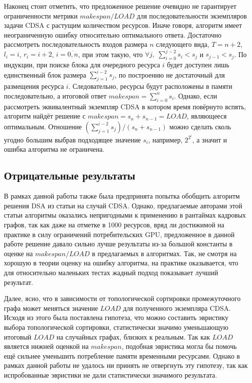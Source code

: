 Наконец стоит отметить, что предложенное решение очевидно не гарантирует ограниченности метрики $makespan/LOAD$ для последовательности экземпляров задачи CDSA с растущим количеством ресурсов.
Иначе говоря, алгоритм имеет неограниченную ошибку относительно оптимального ответа.
Достаточно рассмотреть последовательность входов размера $n$ следующего вида, $T = n + 2$, $l_i = i$, $r_i = i + 2$, $i = \overline{0,n}$, при этом такую, что $\forall j,\;\sum_{i=0}^{j-2} s_i < s_j$ и $s_{j-1} < s_j$.
По индукции, при поиске блока для очередного ресурса $i$ будет доступен лишь единственный блок размера $\sum_{j=1}^{i-2} s_j$, по построению не достаточный для размещения ресурса $i$.
Следовательно, ресурсы будут расположены в памяти последовательно, а итоговой ответ $makespan = \sum_{i=0}^n s_i$.
Однако, если рассмотреть эквивалентный экземпляр CDSA в котором время повёрнуто вспять, алгоритм найдёт решение с $makespan = s_n + s_{n-1} = LOAD$, являющееся оптимальным.
Отношение $\left(\sum_{j=1}^{i-2} s_j\right)/\left(s_n + s_{n-1}\right)$ можно сделать сколь угодно большим выбрав подходящее значение $s_i$, например, $2^{2^i}$, а значит и ошибка алгоритма не ограничена.

\subsection{Отрицательные результаты} \label{negativeResults}
В рамках данной работы также была предпринята попытка обобщить алгоритм решения DSA из статьи \cite{buchsbaum_opt_2003} на случай CDSA.
Однако, предлагаемые авторами этой статьи алгоритмы оказались непригодными к применению в рантаймах кадровых графов, так как даже на отметке в 1000 ресурсов, вряд ли достижимой на практике в силу ограничений потребительских GPU, предложенное в данной работе решение давало сильно лучше результаты из-за большой константы в оценке на $makespan/LOAD$ в предлагаемых в \cite{buchsbaum_opt_2003} алгоритмах.
Так, не смотря на хорошую в теории оценку на ошибку алгоритма, на практике оказывается, что для относительно маленьких тестах жадный подход показывает лучший результат.

Далее, ясно, что в зависимости от топологической сортировки промежуточного графа может меняться значение $LOAD$ для полученного экземпляра CDSA.
Исходя из этого была поставлена гипотеза, что можно составить эвристику выбора топологической сортировки, статистически значимо уменьшающую итоговый $LOAD$ на случайных графах, близких к реальным.
Так как $LOAD$ является нижней оценкой на $makespan$, подобная эвристика могла бы помочь ещё сильнее уменьшить потребление памяти временными ресурсами.
Однако в рамках данной работы не удалось ни принять не отвергнуть эту гипотезу, так как испробованные эвристики не дали статистически значимого результата.
